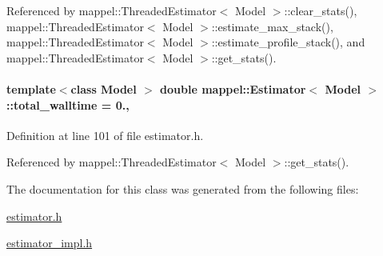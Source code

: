 Referenced by mappel\+::\+Threaded\+Estimator$<$ Model $>$\+::clear\+\_\+stats(), mappel\+::\+Threaded\+Estimator$<$ Model $>$\+::estimate\+\_\+max\+\_\+stack(), mappel\+::\+Threaded\+Estimator$<$ Model $>$\+::estimate\+\_\+profile\+\_\+stack(), and mappel\+::\+Threaded\+Estimator$<$ Model $>$\+::get\+\_\+stats().

\paragraph[{\texorpdfstring{total\+\_\+walltime}{total_walltime}}]{\setlength{\rightskip}{0pt plus 5cm}template$<$class Model $>$ double {\bf mappel\+::\+Estimator}$<$ Model $>$\+::total\+\_\+walltime = 0.\hspace{0.3cm}{\ttfamily [protected]}, {\ttfamily [inherited]}}\hypertarget{classmappel_1_1Estimator_a5a408458a111c5222193871fa6bb6644}{}\label{classmappel_1_1Estimator_a5a408458a111c5222193871fa6bb6644}


Definition at line 101 of file estimator.\+h.



Referenced by mappel\+::\+Threaded\+Estimator$<$ Model $>$\+::get\+\_\+stats().



The documentation for this class was generated from the following files\+:\begin{DoxyCompactItemize}
\item 
\hyperlink{estimator_8h}{estimator.\+h}\item 
\hyperlink{estimator__impl_8h}{estimator\+\_\+impl.\+h}\end{DoxyCompactItemize}

